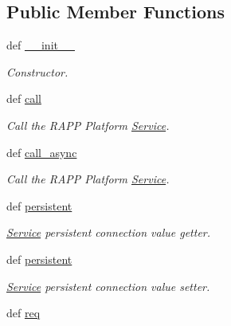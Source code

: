 \subsection*{Public Member Functions}
\begin{DoxyCompactItemize}
\item 
def \hyperlink{classRappCloud_1_1Service_1_1RappPlatformService_1_1RappPlatformService_aec6715dc98865445fbe3e6c93f958d3f}{\-\_\-\-\_\-init\-\_\-\-\_\-}
\begin{DoxyCompactList}\small\item\em Constructor. \end{DoxyCompactList}\item 
def \hyperlink{classRappCloud_1_1Service_1_1RappPlatformService_1_1RappPlatformService_aef1a5d84878267c46e65ed15ce71b588}{call}
\begin{DoxyCompactList}\small\item\em Call the R\-A\-P\-P Platform \hyperlink{namespaceRappCloud_1_1Service}{Service}. \end{DoxyCompactList}\item 
def \hyperlink{classRappCloud_1_1Service_1_1RappPlatformService_1_1RappPlatformService_acd123bb9df2f4c4c9420063072d6c186}{call\-\_\-async}
\begin{DoxyCompactList}\small\item\em Call the R\-A\-P\-P Platform \hyperlink{namespaceRappCloud_1_1Service}{Service}. \end{DoxyCompactList}\item 
def \hyperlink{classRappCloud_1_1Service_1_1RappPlatformService_1_1RappPlatformService_a5a47870f44eb2926a017c2caeb4122ff}{persistent}
\begin{DoxyCompactList}\small\item\em \hyperlink{namespaceRappCloud_1_1Service}{Service} persistent connection value getter. \end{DoxyCompactList}\item 
def \hyperlink{classRappCloud_1_1Service_1_1RappPlatformService_1_1RappPlatformService_a5a47870f44eb2926a017c2caeb4122ff}{persistent}
\begin{DoxyCompactList}\small\item\em \hyperlink{namespaceRappCloud_1_1Service}{Service} persistent connection value setter. \end{DoxyCompactList}\item 
def \hyperlink{classRappCloud_1_1Service_1_1RappPlatformService_1_1RappPlatformService_a62960c2896a5532d7a74d4a36671e541}{req}

\end{DoxyCompactItemize}
